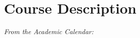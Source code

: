 \begin{titlepage}
\begin{center}
  \end{center}

  \section{Course Description}
  \label{description}

  \emph{From the Academic Calendar:} \cdescrip

\end{titlepage}
\setcounter{page}{2} %
